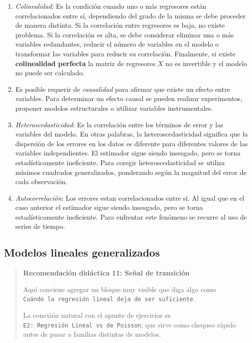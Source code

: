 \documentclass[
]{book}
\providecommand{\tightlist}{%
  \setlength{\itemsep}{0pt}\setlength{\parskip}{0pt}}
\begin{document}
\begin{enumerate}
\def\labelenumi{\arabic{enumi}.}
\tightlist
\item
  \emph{Colinealidad}: Es la condición cuando uno o más regresores están
  correlacionados entre sí, dependiendo del grado de la misma se debe
  proceder de manera distinta. Si la correlación entre regresores es
  baja, no existe problema. Si la correlación es alta, se debe
  considerar eliminar una o más variables redundantes, reducir el
  número de variables en el modelo o transformar las variables para
  reducir su correlación. Finalmente, si existe \textbf{colinealidad
  perfecta} la matriz de regresores \(X\) no es invertible y el modelo
  no puede ser calculado.
\item
  Es posible requerir de \emph{causalidad} para afirmar que existe un
  efecto entre variables. Para determinar un efecto causal se pueden
  realizar experimentos, proponer modelos estructurales o utilizar
  variables instrumentales.
\item
  \emph{Heteroscedasticidad}: Es la correlación entre los términos de error
  y las variables del modelo. En otras palabras, la
  heteroscedasticidad significa que la dispersión de los errores en
  los datos es diferente para diferentes valores de las variables
  independientes. El estimador sigue siendo insesgado, pero se torna
  estadísticamente ineficiente. Para coregir heteroscedasticidad se
  utiliza mínimos cuadrados generalizados, ponderando según la
  magnitud del error de cada observación.
\item
  \emph{Autocorrelación}: Los errores estan correlacionados entre sí. Al
  igual que en el caso anterior el estimador sigue siendo insesgado,
  pero se torna estadísticamente ineficiente. Para enfrentar este
  fenómeno se recurre al uso de series de tiempo.
\end{enumerate}

\subsection{Modelos lineales generalizados}\label{modelos-lineales-generalizados-1}

\begin{quote}
\textbf{Recomendación didáctica 11: Señal de transición}

Aquí conviene agregar un bloque muy visible que diga algo como
\texttt{Cuándo\ la\ regresión\ lineal\ deja\ de\ ser\ suficiente}.

La conexión natural con el apunte de ejercicios es
\texttt{E2:\ Regresión\ Lineal\ vs\ de\ Poisson}, que sirve como chequeo rápido
antes de pasar a familias distintas de modelos.
\end{quote}
\end{document}
